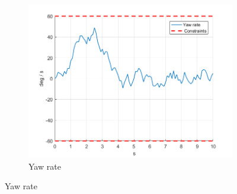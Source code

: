 \documentclass[11pt]{article}
\begin{document}
\begin{enumerate}
\begin{figure}[ht]
\begin{subfigure}[c]{0.3\linewidth}
            \includegraphics[width=\linewidth]{Plots_10_OffsetFreeTracking_Varying/06}
            \caption{Yaw rate}
        \end{subfigure}


\end{figure}
\end{enumerate}
\end{document}
